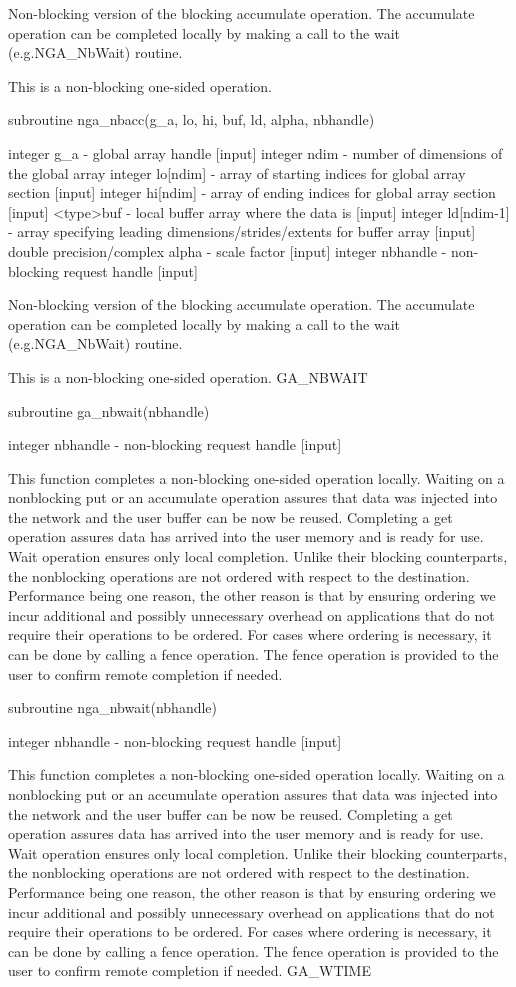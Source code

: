 Non-blocking version of the blocking accumulate operation. The accumulate
operation can be completed locally by making a call to the wait (e.g.NGA\_NbWait)
routine.

This is a non-blocking one-sided operation.

subroutine nga\_nbacc(g\_a, lo, hi, buf, ld, alpha, nbhandle)

integer g\_a - global array handle {[}input{]} integer ndim - number
of dimensions of the global array integer lo{[}ndim{]} - array of
starting indices for global array section {[}input{]} integer hi{[}ndim{]}
- array of ending indices for global array section {[}input{]} <type>buf
- local buffer array where the data is {[}input{]} integer ld{[}ndim-1{]}
- array specifying leading dimensions/strides/extents for buffer array
{[}input{]} double precision/complex alpha - scale factor {[}input{]}
integer nbhandle - non-blocking request handle {[}input{]}

Non-blocking version of the blocking accumulate operation. The accumulate
operation can be completed locally by making a call to the wait (e.g.NGA\_NbWait)
routine.

This is a non-blocking one-sided operation. GA\_NBWAIT

subroutine ga\_nbwait(nbhandle)

integer nbhandle - non-blocking request handle {[}input{]}

This function completes a non-blocking one-sided operation locally.
Waiting on a nonblocking put or an accumulate operation assures that
data was injected into the network and the user buffer can be now
be reused. Completing a get operation assures data has arrived into
the user memory and is ready for use. Wait operation ensures only
local completion. Unlike their blocking counterparts, the nonblocking
operations are not ordered with respect to the destination. Performance
being one reason, the other reason is that by ensuring ordering we
incur additional and possibly unnecessary overhead on applications
that do not require their operations to be ordered. For cases where
ordering is necessary, it can be done by calling a fence operation.
The fence operation is provided to the user to confirm remote completion
if needed.

subroutine nga\_nbwait(nbhandle)

integer nbhandle - non-blocking request handle {[}input{]}

This function completes a non-blocking one-sided operation locally.
Waiting on a nonblocking put or an accumulate operation assures that
data was injected into the network and the user buffer can be now
be reused. Completing a get operation assures data has arrived into
the user memory and is ready for use. Wait operation ensures only
local completion. Unlike their blocking counterparts, the nonblocking
operations are not ordered with respect to the destination. Performance
being one reason, the other reason is that by ensuring ordering we
incur additional and possibly unnecessary overhead on applications
that do not require their operations to be ordered. For cases where
ordering is necessary, it can be done by calling a fence operation.
The fence operation is provided to the user to confirm remote completion
if needed. GA\_WTIME

